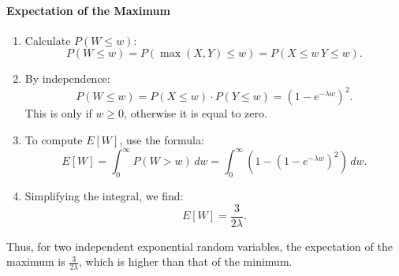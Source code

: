 \paragraph{Expectation of the Maximum}
\begin{enumerate}
    \item Calculate \( P(W \leq w) \):
   \[
   P(W \leq w) = P(\max(X, Y) \leq w) = P(X \leq w \, Y \leq w).
   \]
   \item By independence:
   \[
   P(W \leq w) = P(X \leq w) \cdot P(Y \leq w) = \left(1 - e^{-\lambda w}\right)^2.
   \]
   This is only if $w \geq 0$, otherwise it is equal to zero.
   \item To compute \( E[W] \), use the formula:
   \[
   E[W] = \int_0^{\infty} P(W > w) \, dw = \int_0^{\infty} \left(1 - \left(1 - e^{-\lambda w}\right)^2\right) \, dw.
   \]
   \item Simplifying the integral, we find:
   \[
   E[W] = \frac{3}{2\lambda}.
   \]
\end{enumerate}
Thus, for two independent exponential random variables, the expectation of the maximum is \( \frac{3}{2\lambda} \), which is higher than that of the minimum.

